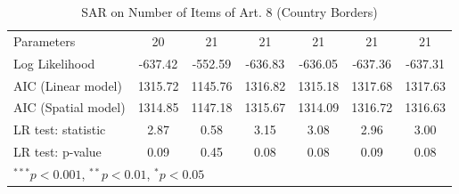 \begin{table}[!h]
\begin{center}
\begin{tabular}{l c c c c c c }
Parameters              & 20           & 21           & 21           & 21           & 21           & 21           \\
Log Likelihood          & -637.42      & -552.59      & -636.83      & -636.05      & -637.36      & -637.31      \\
AIC (Linear model)      & 1315.72      & 1145.76      & 1316.82      & 1315.18      & 1317.68      & 1317.63      \\
AIC (Spatial model)     & 1314.85      & 1147.18      & 1315.67      & 1314.09      & 1316.72      & 1316.63      \\
LR test: statistic      & 2.87         & 0.58         & 3.15         & 3.08         & 2.96         & 3.00         \\
LR test: p-value        & 0.09         & 0.45         & 0.08         & 0.08         & 0.09         & 0.08         \\
\bottomrule
\multicolumn{7}{l}{\scriptsize{$^{***}p<0.001$, $^{**}p<0.01$, $^*p<0.05$}}
\end{tabular}
\caption{SAR on Number of Items of Art. 8 (Country Borders)}
\label{table:coefficients}
\end{center}
\end{table}
